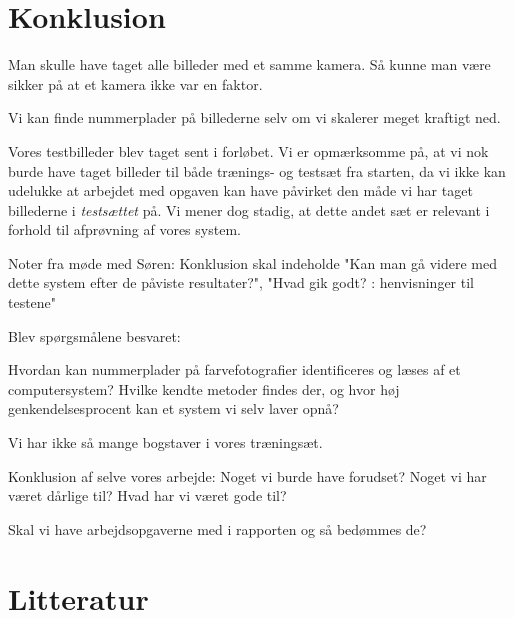 \documentclass[11pt,a4paper,final]{article}
\begin{document}
\section{Konklusion}
Man skulle have taget alle billeder med et samme kamera. Så kunne man være sikker på at et kamera ikke var en faktor.

Vi kan finde nummerplader på billederne selv om vi skalerer meget kraftigt ned.

Vores testbilleder blev taget sent i forløbet. Vi er opmærksomme på, at vi nok burde have taget  billeder til både trænings- og testsæt fra starten, da vi ikke kan udelukke at arbejdet med opgaven kan have påvirket den måde vi har taget billederne i \textit{testsættet} på. Vi mener dog stadig, at dette andet sæt er relevant i forhold til afprøvning af vores system.

Noter fra møde med Søren: Konklusion skal indeholde "Kan man gå videre med dette system efter de påviste resultater?", "Hvad gik godt? : henvisninger til testene"

Blev spørgsmålene besvaret:

Hvordan kan nummerplader på farvefotografier identificeres og læses af et computersystem? Hvilke kendte metoder findes der, og hvor høj genkendelsesprocent kan et system vi selv laver opnå?

Vi har ikke så mange bogstaver i vores træningsæt.

Konklusion af selve vores arbejde: Noget vi burde have forudset? Noget vi har været dårlige til? Hvad har vi været gode til?

Skal vi have arbejdsopgaverne med i rapporten og så bedømmes de?


\newpage %
%
\section{Litteratur}
\end{document}
